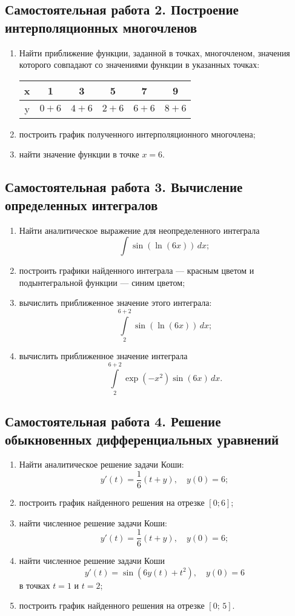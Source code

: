 \documentclass[10pt, a4paper, titlepage]{article}
\begin{document}
\subsection*{Самостоятельная работа \textnumero{} 2. Построение интерполяционных многочленов}
\begin{enumerate}
    \item Найти приближение функции, заданной в точках, многочленом, значения которого совпадают со значениями функции в указанных точках:
    \begin{center}
         \begin{tabular}{|c|c|c|c|c|c|}
             \hline
             x & 1 & 3 & 5 & 7 & 9 \\ \hline
             y & $0+6$ & $4+6$ & $2+6$ & $6+6$ & $8+6$ \\
             \hline
         \end{tabular}
    \end{center}
    \item построить график полученного интерполяционного многочлена;
    \item найти значение функции в точке $x=6$.
\end{enumerate}

\subsection*{Самостоятельная работа \textnumero{} 3. Вычисление определенных интегралов}
\begin{enumerate}
    \item Найти аналитическое выражение для неопределенного интеграла $$\int \sin(\ln(6x))\,dx ;$$
    \item построить графики найденного интеграла --- красным цветом и подынтегральной функции --- синим цветом;
    \item вычислить приближенное значение этого интеграла: $$\int\limits_2^{6+2} \sin(\ln(6x))\,dx ;$$
    \item вычислить приближенное значение интеграла $$\int\limits_2^{6+2} \exp(-x^2)\sin(6x)\,dx .$$
\end{enumerate}

\subsection*{Самостоятельная работа \textnumero{} 4. Решение обыкновенных дифференциальных уравнений}
\begin{enumerate}
    \item Найти аналитическое решение задачи Коши: $$y'(t)=\frac{1}{6}(t+y), \quad y(0)=6 ;$$
    \item построить график найденного решения на отрезке $[0; 6]$;
    \item найти численное решение задачи Коши: $$y'(t)=\frac{1}{6}(t+y), \quad y(0)=6 ;$$
    \item найти численное решение задачи Коши $$y'(t)=\sin(6y(t)+t^2), \quad y(0)=6$$ в точках $t=1$ и $t=2$;
    \item построить график найденного решения на отрезке $[0;\,5]$.
\end{enumerate}
\end{document}
